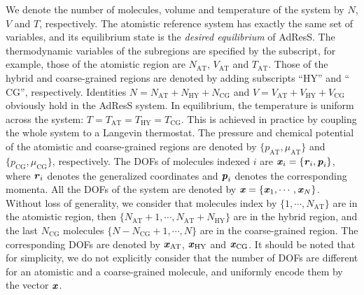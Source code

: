 \documentclass[epjST]{svjour}
\newcommand{\redc}[1]{{\color{red} #1}}
\newcommand{\vect}[1]{\textbf{\textit{#1}}}
\newcommand{\AT}[0]{\textrm{AT}}
\newcommand{\HY}[0]{\textrm{HY}}
\newcommand{\CG}[0]{\textrm{CG}}
\newcommand{\moleidxone}[0]{i}
\begin{document}
We denote the number of molecules, volume and temperature of the system by $N$, $V$ and $T$, respectively.
The atomistic reference system has exactly the same set of variables, and its equilibrium state  is
the \emph{desired equilibrium} of AdResS.
The thermodynamic variables of the subregions are specified by the subscript,
for example, those of the atomistic region are 
$N_\AT$, $V_\AT$ and $T_\AT$. Those of the hybrid and coarse-grained regions
are denoted by adding subscripts ``$\HY$'' and ``$\CG$'', respectively.
Identities $N = N_\AT + N_\HY + N_\CG$ and $V = V_\AT + V_\HY + V_\CG$ obviously hold
in the AdResS system.
In equilibrium, the temperature is uniform across the system: $T = T_\AT = T_\HY = T_\CG$.
This is achieved in practice by coupling the whole system to a Langevin thermostat.
The pressure and chemical potential of the atomistic and coarse-grained regions
are denoted by $\{p_\AT, \mu_\AT\}$
and $\{p_\CG, \mu_\CG\}$, respectively.
The DOFs of molecules indexed $\moleidxone$ are $\vect x_\moleidxone = \{\vect r_\moleidxone, \vect p_\moleidxone\}$, where
$\vect r_\moleidxone$ denotes the generalized coordinates and $\vect p_\moleidxone$ denotes the corresponding momenta.
All the DOFs of the system are denoted by $\vect x = \{\vect x_1, \cdots, \vect x_N\}$. Without loss of
generality, we consider that molecules index by $\{1, \cdots, N_\AT\}$ are in the atomistic region, then $\{N_\AT+1, \cdots, N_\AT + N_\HY\}$ are in the hybrid region, and
the last $N_\CG$ molecules $\{N-N_\CG+1, \cdots, N\}$ are in the coarse-grained region. The corresponding DOFs are denoted by $\vect x_\AT$, $\vect x_\HY$ and $\vect x_\CG$.
It should be noted that for simplicity, we do not explicitly consider that the number of DOFs are different for an atomistic
and a coarse-grained molecule, and uniformly encode them by the vector $\vect x$.

\end{document}
